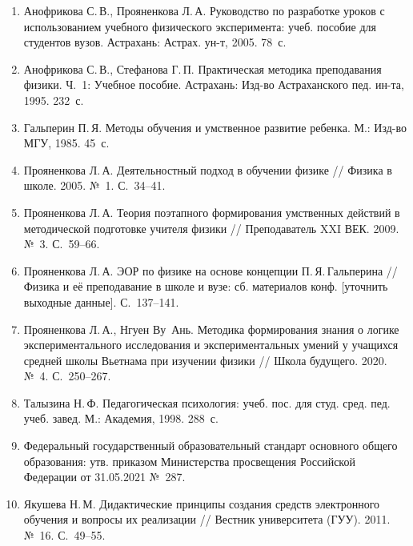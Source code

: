 \documentclass[14pt]{extarticle}
\begin{document}
\begin{enumerate}
\item Анофрикова С.\,В., Прояненкова Л.\,А. Руководство по разработке
  уроков с использованием учебного физического эксперимента: учеб. пособие
  для студентов вузов. Астрахань: Астрах. ун-т, 2005. 78~с.

\item Анофрикова С.\,В., Стефанова Г.\,П. Практическая методика преподавания
  физики. Ч.~1: Учебное пособие. Астрахань: Изд-во Астраханского пед. ин-та,
  1995. 232~с.

\item Гальперин П.\,Я. Методы обучения и умственное развитие ребенка.
  М.: Изд-во МГУ, 1985. 45~с.

\item Прояненкова Л.\,А. Деятельностный подход в обучении физике //
  Физика в школе. 2005. №~1. С.~34--41.

\item Прояненкова Л.\,А. Теория поэтапного формирования умственных действий
  в методической подготовке учителя физики // Преподаватель XXI ВЕК. 2009.
  №~3. С.~59--66.

\item Прояненкова Л.\,А. ЭОР по физике на основе концепции П.\,Я.\,Гальперина //
  Физика и её преподавание в школе и вузе: сб. материалов конф.
  [уточнить выходные данные]. С.~137--141.

\item Прояненкова Л.\,А., Нгуен Ву~Ань. Методика формирования знания о логике
  экспериментального исследования и экспериментальных умений у учащихся средней
  школы Вьетнама при изучении физики // Школа будущего. 2020. №~4.
  С.~250--267.

\item Талызина Н.\,Ф. Педагогическая психология: учеб. пос. для студ. сред. пед.
  учеб. завед. М.: Академия, 1998. 288~с.

\item Федеральный государственный образовательный стандарт основного общего
  образования: утв. приказом Министерства просвещения Российской Федерации
  от 31.05.2021 №~287.

\item Якушева Н.\,М. Дидактические принципы создания средств электронного
  обучения и вопросы их реализации // Вестник университета (ГУУ). 2011.
  №~16. С.~49--55.
\end{enumerate}
\end{document}

